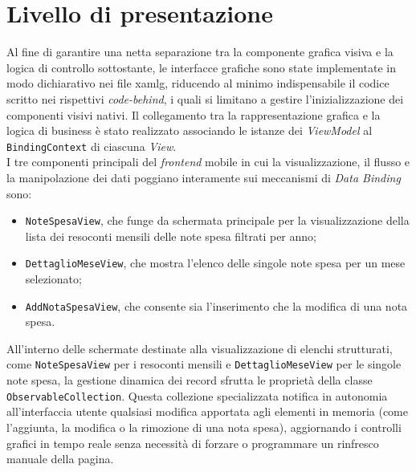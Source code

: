 \section{Livello di presentazione}
\label{sec:implementazione-presentazione}
\noindent Al fine di garantire una netta separazione tra la componente grafica visiva e la logica di controllo sottostante, le interfacce grafiche sono state implementate in modo dichiarativo nei file \gls{xamlg}, riducendo al minimo indispensabile il codice scritto nei rispettivi \textit{code-behind}, i quali si limitano a gestire l'inizializzazione dei componenti visivi nativi. Il collegamento tra la rappresentazione grafica e la logica di business è stato realizzato associando le istanze dei \textit{ViewModel} al \texttt{BindingContext} di ciascuna \textit{View}.\\
I tre componenti principali del \textit{frontend} mobile in cui la visualizzazione, il flusso e la manipolazione dei dati poggiano interamente sui meccanismi di \textit{Data Binding} sono:
\begin{itemize}
    \item \texttt{NoteSpesaView}, che funge da schermata principale per la visualizzazione della lista dei resoconti mensili delle note spesa filtrati per anno;
    \item \texttt{DettaglioMeseView}, che mostra l'elenco delle singole note spesa per un mese selezionato;
    \item \texttt{AddNotaSpesaView}, che consente sia l'inserimento che la modifica di una nota spesa.
\end{itemize} 
\noindent All'interno delle schermate destinate alla visualizzazione di elenchi strutturati, come \texttt{NoteSpesaView} per i resoconti mensili e \texttt{DettaglioMeseView} per le singole note spesa, la gestione dinamica dei record sfrutta le proprietà della classe \texttt{ObservableCollection}. Questa collezione specializzata notifica in autonomia all'interfaccia utente qualsiasi modifica apportata agli elementi in memoria (come l'aggiunta, la modifica o la rimozione di una nota spesa), aggiornando i controlli grafici in tempo reale senza necessità di forzare o programmare un rinfresco manuale della pagina.\\
